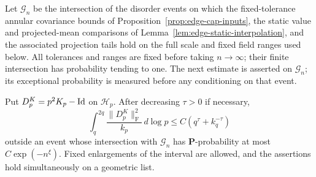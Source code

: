 Let $\mathcal G_n$ be the intersection of the disorder events on which
the fixed-tolerance annular covariance bounds of
Proposition~\ref{prop:edge-cap-inputs}, the static value and projected-mean
comparisons of Lemma~\ref{lem:edge-static-interpolation}, and the associated
projection tails hold on the full scale and fixed field ranges used below.
All tolerances and ranges are fixed before taking $n\to\infty$; their
finite intersection has probability tending to one.
The next estimate is asserted on $\mathcal G_n$; its exceptional probability
is measured before any conditioning on that event.

\begin{lemma}\label{lem:observations-curvature}
Put $D_p^K=p^2K_p-\operatorname{Id}$ on $\mathcal H_p$. After decreasing $\tau>0$ if
necessary,
\begin{equation}\label{eq:source-14}
 \int_q^{2q}\frac{\|D_p^K\|_{\mathrm F}^2}{k_p}\,d\log p
 \le C(q^\tau+k_q^{-\tau})
\end{equation}
outside an event whose intersection with $\mathcal G_n$ has
$\mathbf P$-probability at most $C\exp(-n^\xi)$. Fixed enlargements of
the interval are allowed, and the assertions hold simultaneously on a
geometric list.
\end{lemma}

